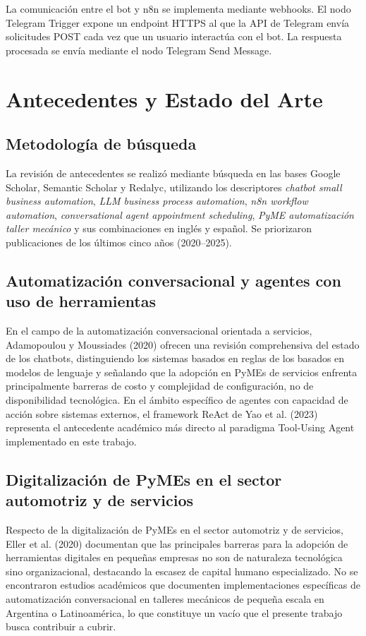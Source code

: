 \documentclass[12pt,a4paper]{report}
\begin{document}
La comunicación entre el bot y n8n se implementa mediante webhooks. El nodo Telegram Trigger expone un endpoint HTTPS al que la API de Telegram envía solicitudes POST cada vez que un usuario interactúa con el bot. La respuesta procesada se envía mediante el nodo Telegram Send Message.

\section{Antecedentes y Estado del Arte}

\subsection{Metodología de búsqueda}

La revisión de antecedentes se realizó mediante búsqueda en las bases Google Scholar, Semantic Scholar y Redalyc, utilizando los descriptores \textit{chatbot small business automation}, \textit{LLM business process automation}, \textit{n8n workflow automation}, \textit{conversational agent appointment scheduling}, \textit{PyME automatización taller mecánico} y sus combinaciones en inglés y español. Se priorizaron publicaciones de los últimos cinco años (2020--2025).

\subsection{Automatización conversacional y agentes con uso de herramientas}

En el campo de la automatización conversacional orientada a servicios, Adamopoulou y Moussiades (2020) ofrecen una revisión comprehensiva del estado de los chatbots, distinguiendo los sistemas basados en reglas de los basados en modelos de lenguaje y señalando que la adopción en PyMEs de servicios enfrenta principalmente barreras de costo y complejidad de configuración, no de disponibilidad tecnológica. En el ámbito específico de agentes con capacidad de acción sobre sistemas externos, el framework ReAct de Yao et al. (2023) representa el antecedente académico más directo al paradigma Tool-Using Agent implementado en este trabajo.

\subsection{Digitalización de PyMEs en el sector automotriz y de servicios}

Respecto de la digitalización de PyMEs en el sector automotriz y de servicios, Eller et al. (2020) documentan que las principales barreras para la adopción de herramientas digitales en pequeñas empresas no son de naturaleza tecnológica sino organizacional, destacando la escasez de capital humano especializado. No se encontraron estudios académicos que documenten implementaciones específicas de automatización conversacional en talleres mecánicos de pequeña escala en Argentina o Latinoamérica, lo que constituye un vacío que el presente trabajo busca contribuir a cubrir.
\end{document}
